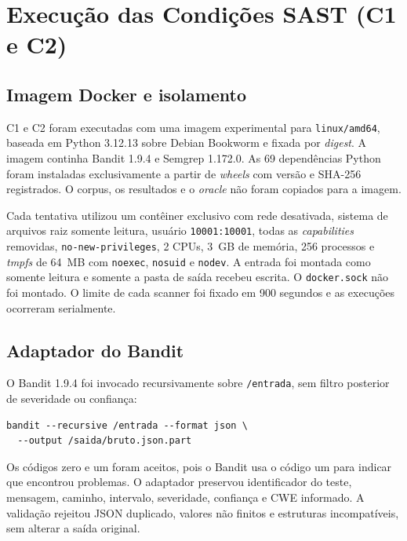 \section{Execução das Condições SAST (C1 e C2)}\label{sec:execucao-sast-desenvolvimento}

\subsection{Imagem Docker e isolamento}\label{subsec:construcao-imagem-docker}

C1 e C2 foram executadas com uma imagem experimental para \texttt{linux/amd64}, baseada em Python 3.12.13 sobre Debian Bookworm e fixada por \textit{digest}. A imagem continha Bandit 1.9.4 e Semgrep 1.172.0. As 69 dependências Python foram instaladas exclusivamente a partir de \textit{wheels} com versão e SHA-256 registrados. O corpus, os resultados e o \textit{oracle} não foram copiados para a imagem.

Cada tentativa utilizou um contêiner exclusivo com rede desativada, sistema de arquivos raiz somente leitura, usuário \texttt{10001:10001}, todas as \textit{capabilities} removidas, \texttt{no-new-privileges}, 2 CPUs, 3~GB de memória, 256 processos e \textit{tmpfs} de 64~MB com \texttt{noexec}, \texttt{nosuid} e \texttt{nodev}. A entrada foi montada como somente leitura e somente a pasta de saída recebeu escrita. O \texttt{docker.sock} não foi montado. O limite de cada scanner foi fixado em 900 segundos e as execuções ocorreram serialmente.

\subsection{Adaptador do Bandit}\label{subsec:execucao-bandit}

O Bandit 1.9.4 foi invocado recursivamente sobre \texttt{/entrada}, sem filtro posterior de severidade ou confiança:

\begin{verbatim}
bandit --recursive /entrada --format json \
  --output /saida/bruto.json.part
\end{verbatim}

Os códigos zero e um foram aceitos, pois o Bandit usa o código um para indicar que encontrou problemas. O adaptador preservou identificador do teste, mensagem, caminho, intervalo, severidade, confiança e CWE informado. A validação rejeitou JSON duplicado, valores não finitos e estruturas incompatíveis, sem alterar a saída original.

